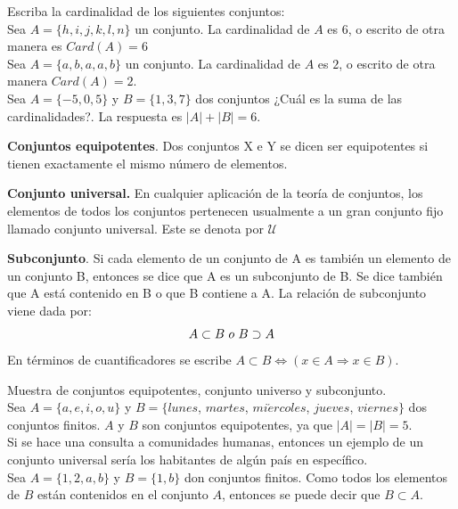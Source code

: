 \begin{myexample}
Escriba la cardinalidad de los siguientes conjuntos:\\

\noindent Sea $A=\{h,i,j,k,l,n\}$ un conjunto. La cardinalidad de $A$ es $6$, o escrito de otra manera es $Card(A)=6$\\

\noindent Sea $A=\{a,b,a,a,b\}$ un conjunto. La cardinalidad de $A$ es $2$, o escrito de otra manera $Card(A)=2$.\\

\noindent Sea $A=\{-5,0,5\}$ y $B=\{1,3,7\}$ dos conjuntos ¿Cuál es la suma de las cardinalidades?. La respuesta es $|A|+|B|=6$.
\end{myexample}


\begin{mydef}
\textbf{Conjuntos equipotentes}. Dos conjuntos X e Y se dicen ser equipotentes si tienen exactamente el mismo número de elementos.
\end{mydef}

\begin{mydef}\label{conjuntoU}
\textbf{Conjunto universal. }En cualquier aplicación de la teoría de conjuntos, los elementos de todos los conjuntos pertenecen usualmente a un gran conjunto fijo llamado conjunto universal. Este se denota por $\mathcal{U}$
\end{mydef}

\begin{mydef}
\textbf{Subconjunto}. Si cada elemento de un conjunto de A es también un elemento de un conjunto B, entonces se dice que A es un subconjunto de B. Se dice también que A está contenido en B o que B contiene a A. La relación de subconjunto viene dada por:\\
\begin{equation*}
A\subset B \hspace{3px} o \hspace{3px} B\supset A
\end{equation*} 
En términos de cuantificadores se escribe $A\subset B\Leftrightarrow (x\in A\Rightarrow x\in B)$.
\end{mydef}

\begin{myexample}
Muestra de conjuntos equipotentes, conjunto universo y subconjunto.\\

\noindent Sea $A=\{a,e,i,o,u\}$ y $B=\{lunes$, $martes$, $mi\acute{e}rcoles$, $jueves$, $viernes\}$ dos conjuntos finitos. $A$ y $B$ son conjuntos equipotentes, ya que $|A|=|B|=5$.\\

\noindent Si se hace una consulta a comunidades humanas, entonces un ejemplo de un conjunto universal sería los habitantes de algún país en específico.\\

\noindent Sea $A=\{1,2,a,b\}$ y $B=\{1,b\}$ don conjuntos finitos. Como todos los elementos de $B$ están contenidos en el conjunto $A$, entonces se puede decir que $B\subset A$.
\end{myexample}



